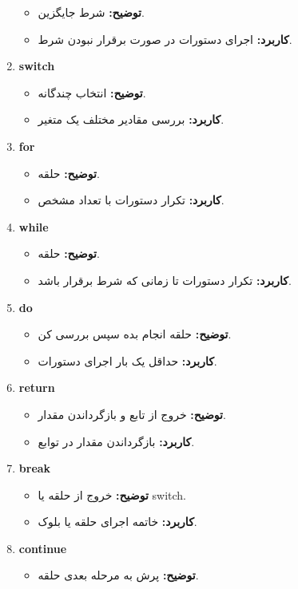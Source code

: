 \documentclass[12pt, a4paper]{report}
\begin{document}
\begin{enumerate}
	\begin{itemize}
		\item \textbf{توضیح:} شرط جایگزین.
		\item \textbf{کاربرد:} اجرای دستورات در صورت برقرار نبودن شرط.
	\end{itemize}
	\item \textbf{switch}
	\begin{itemize}
		\item \textbf{توضیح:} انتخاب چندگانه.
		\item \textbf{کاربرد:} بررسی مقادیر مختلف یک متغیر.
	\end{itemize}
	\item \textbf{for}
	\begin{itemize}
		\item \textbf{توضیح:} حلقه.
		\item \textbf{کاربرد:} تکرار دستورات با تعداد مشخص.
	\end{itemize}
	\item \textbf{while}
	\begin{itemize}
		\item \textbf{توضیح:} حلقه.
		\item \textbf{کاربرد:} تکرار دستورات تا زمانی که شرط برقرار باشد.
	\end{itemize}
	\item \textbf{do}
	\begin{itemize}
		\item \textbf{توضیح:} حلقه انجام بده سپس بررسی کن.
		\item \textbf{کاربرد:} حداقل یک بار اجرای دستورات.
	\end{itemize}
	\item \textbf{return}
	\begin{itemize}
		\item \textbf{توضیح:} خروج از تابع و بازگرداندن مقدار.
		\item \textbf{کاربرد:} بازگرداندن مقدار در توابع.
	\end{itemize}
	\item \textbf{break}
	\begin{itemize}
		\item \textbf{توضیح:} خروج از حلقه یا switch.
		\item \textbf{کاربرد:} خاتمه اجرای حلقه یا بلوک.
	\end{itemize}
	\item \textbf{continue}
	\begin{itemize}
		\item \textbf{توضیح:} پرش به مرحله بعدی حلقه.

\end{itemize}
\end{enumerate}
\end{document}

